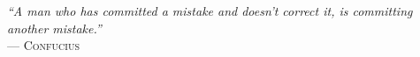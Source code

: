 ﻿\documentclass[../ppgc-tese.tex]{subfiles}
\begin{document}
\begin{flushright}
\mbox{}%
{\sffamily\itshape
``A man who has committed a mistake and doesn't correct it, is committing another mistake.'' \\}
--- \textsc{Confucius}
\end{flushright}
\end{document}
